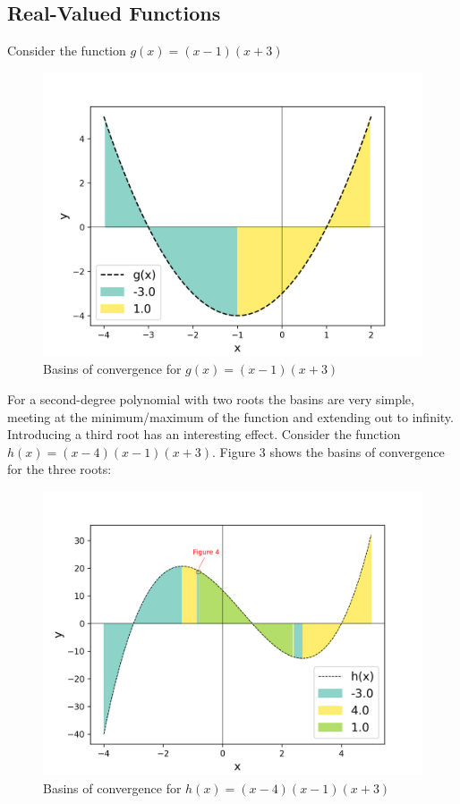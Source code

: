 \documentclass[10pt,a4paper]{article}
\begin{document}
		\subsection{Real-Valued Functions}
		Consider the function $ g(x) = (x - 1)(x + 3) $
		\begin{figure}[H]
			\centering
			\caption{Basins of convergence for $g(x) = (x - 1)(x + 3)$}
			\includegraphics[scale=0.5]{figure2}
		\end{figure}
		For a second-degree polynomial with two roots the basins are very simple, meeting at the minimum/maximum of the function and extending out to infinity. Introducing a third root has an interesting effect. Consider the function $ h(x) =  (x - 4)(x - 1)(x + 3)$. Figure 3 shows the basins of convergence for the three roots:
		\begin{figure}[H]
			\centering
			\caption{Basins of convergence for $h(x) = (x - 4)(x - 1)(x + 3)$}
			\includegraphics[scale=0.5]{figure3}
		\end{figure}
\end{document}
